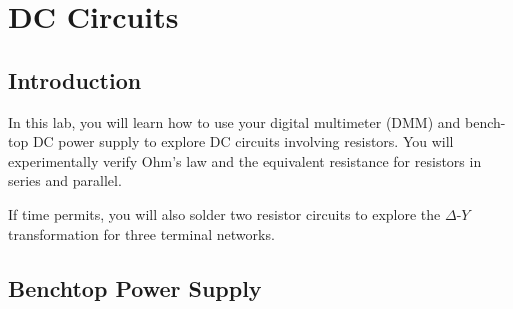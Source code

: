 \chapter{DC Circuits}


\section{Introduction}

In this lab, you will learn how to use your digital multimeter (DMM)
and bench-top DC power supply to explore DC circuits involving
resistors.  You will experimentally verify Ohm's law and the
equivalent resistance for resistors in series and parallel.

If time permits, you will also solder two resistor circuits to explore
the $\Delta$-$Y$ transformation for three terminal networks.

\section{Benchtop Power Supply}

